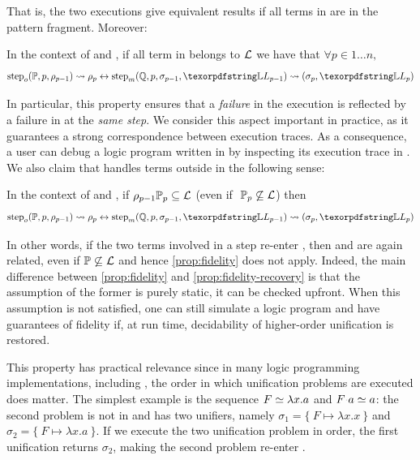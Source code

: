 \noindent
That is, the two executions give equivalent results if all terms in
\foUnifPb are in the pattern fragment. Moreover:

\begin{proposition}\label{prop:fidelity}
In the context of  \frun and \hrun, if all term in \foUnifPb belongs to $\mathcal{L}$ we have that
$\forall p \in 1 \ldots n,$
$$
\stepF{\foUnifPb}{p}{\rho_{p-1}}{\rho_p}
\leftrightarrow
\stepH{\hoUnifPb}{p}{\sigma_{p-1}}{\linkStore_{p-1}}{\sigma_p}{\linkStore_p}
$$
\end{proposition}
\noindent
In particular, this property ensures that a \emph{failure} in the
\Fo{} execution is reflected by a failure in \Ho{} at the
\emph{same step}. We consider this aspect important in practice,
as it guarantees a strong correspondence between execution
traces.
As a consequence, a user can debug a logic program written in
\Fo{} by inspecting its execution trace in \Ho{}.
We also claim that \hrun handles terms outside \llambda in the following sense:

\begin{proposition}\label{prop:fidelity-recovery} 
In the context of \frun and \hrun, if 
$\rho_{p-1} \mathbb{P}_{p} \subseteq \mathcal{L}$ 
(even if $\;\mathbb{P}_{p} \not\subseteq \mathcal{L}$)
then
$$
\stepF{\foUnifPb}{p}{\rho_{p-1}}{\rho_p} \leftrightarrow
\stepH{\hoUnifPb}{p}{\sigma_{p-1}}{\linkStore_{p-1}}{\sigma_{p}}{\linkStore_p}
$$
\end{proposition}

\noindent
In other words, if the two terms involved in a step
re-enter \llambda, then \hstep and \fstep are again related, even if
$\mathbb{P} \not\subseteq \mathcal{L}$ and hence \cref{prop:fidelity} does not apply.
Indeed, the main difference between \cref{prop:fidelity} and \cref{prop:fidelity-recovery}
is that the assumption of the former is purely static, it can be checked upfront. 
When this assumption is not satisfied, one can still simulate a logic program and
have guarantees of fidelity if, at run time, decidability of higher-order
unification is restored.

This property has practical relevance since in many logic programming
implementations, including \elpi, the order in which unification problems
are executed does matter.
The simplest example is the sequence $F \simeq \lambda x.a$ and
$F \appsep a \UnifRel a$: the second problem is not in \llambda and has two
unifiers, namely $\sigma_1 = \{~ F \mapsto \lambda x.x ~\}$ and
$\sigma_2 = \{~ F \mapsto \lambda x.a ~\}$. If we execute the two unification
problem in order, the first unification returns $\sigma_2$,
making the second problem re-enter \llambda.

